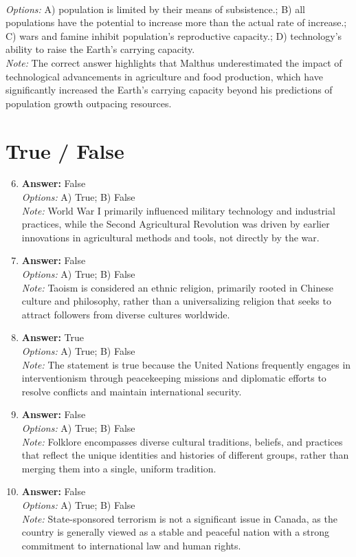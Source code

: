 \documentclass[12pt]{article}
\begin{document}
\begin{enumerate}[label=\arabic*.]
\\ \textit{Options:} A) population is limited by their means of subsistence.; B) all populations have the potential to increase more than the actual rate of increase.; C) wars and famine inhibit population's reproductive capacity.; D) technology's ability to raise the Earth's carrying capacity.
\\ \textit{Note:} The correct answer highlights that Malthus underestimated the impact of technological advancements in agriculture and food production, which have significantly increased the Earth's carrying capacity beyond his predictions of population growth outpacing resources.
\end{enumerate}

\section*{True / False}
\begin{enumerate}[label=\arabic*.]
\setcounter{enumi}{5}
\item \textbf{Answer:} False
\\ \textit{Options:} A) True; B) False
\\ \textit{Note:} World War I primarily influenced military technology and industrial practices, while the Second Agricultural Revolution was driven by earlier innovations in agricultural methods and tools, not directly by the war.
\item \textbf{Answer:} False
\\ \textit{Options:} A) True; B) False
\\ \textit{Note:} Taoism is considered an ethnic religion, primarily rooted in Chinese culture and philosophy, rather than a universalizing religion that seeks to attract followers from diverse cultures worldwide.
\item \textbf{Answer:} True
\\ \textit{Options:} A) True; B) False
\\ \textit{Note:} The statement is true because the United Nations frequently engages in interventionism through peacekeeping missions and diplomatic efforts to resolve conflicts and maintain international security.
\item \textbf{Answer:} False
\\ \textit{Options:} A) True; B) False
\\ \textit{Note:} Folklore encompasses diverse cultural traditions, beliefs, and practices that reflect the unique identities and histories of different groups, rather than merging them into a single, uniform tradition.
\item \textbf{Answer:} False
\\ \textit{Options:} A) True; B) False
\\ \textit{Note:} State-sponsored terrorism is not a significant issue in Canada, as the country is generally viewed as a stable and peaceful nation with a strong commitment to international law and human rights.
\end{enumerate}
\end{document}
